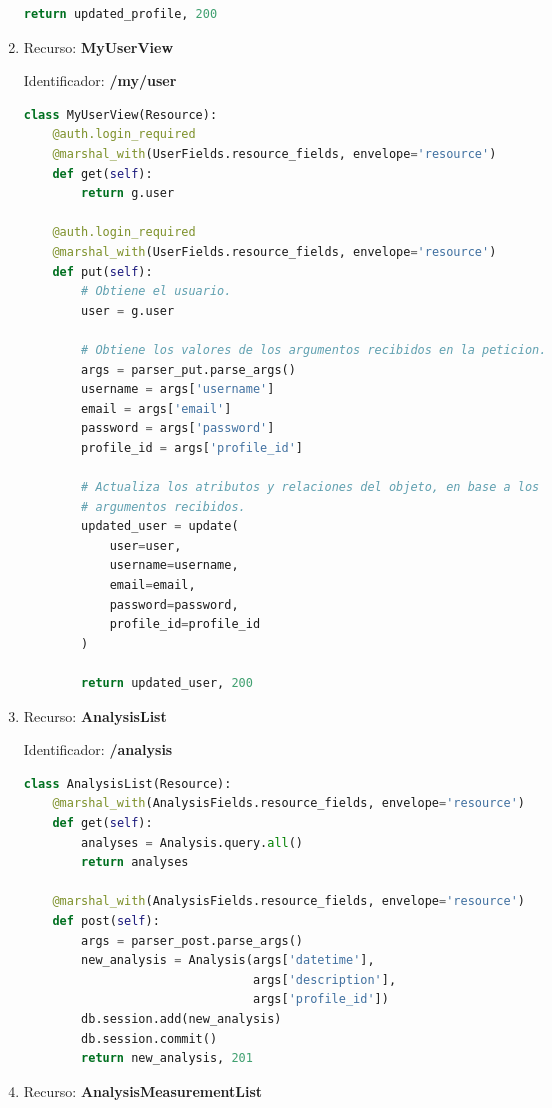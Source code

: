 \documentclass[a4paper,12pt]{article}
\begin{document}
\begin{enumerate}
\begin{lstlisting}[language=Python]
        return updated_profile, 200
\end{lstlisting}

\item Recurso: \textbf{MyUserView}

Identificador: \textbf{/my/user}

\begin{lstlisting}[language=Python]
class MyUserView(Resource):
    @auth.login_required
    @marshal_with(UserFields.resource_fields, envelope='resource')
    def get(self):
        return g.user

    @auth.login_required
    @marshal_with(UserFields.resource_fields, envelope='resource')
    def put(self):
        # Obtiene el usuario.
        user = g.user

        # Obtiene los valores de los argumentos recibidos en la peticion.
        args = parser_put.parse_args()
        username = args['username']
        email = args['email']
        password = args['password']
        profile_id = args['profile_id']

        # Actualiza los atributos y relaciones del objeto, en base a los
        # argumentos recibidos.
        updated_user = update(
            user=user,
            username=username,
            email=email,
            password=password,
            profile_id=profile_id
        )

        return updated_user, 200
\end{lstlisting}

\item 	Recurso: \textbf{AnalysisList}

Identificador: \textbf{/analysis}

\begin{lstlisting}[language=Python]
class AnalysisList(Resource):
    @marshal_with(AnalysisFields.resource_fields, envelope='resource')
    def get(self):
        analyses = Analysis.query.all()
        return analyses

    @marshal_with(AnalysisFields.resource_fields, envelope='resource')
    def post(self):
        args = parser_post.parse_args()
        new_analysis = Analysis(args['datetime'],
                                args['description'],
                                args['profile_id'])
        db.session.add(new_analysis)
        db.session.commit()
        return new_analysis, 201
\end{lstlisting}

\item Recurso: \textbf{AnalysisMeasurementList}


\end{enumerate}
\end{document}
